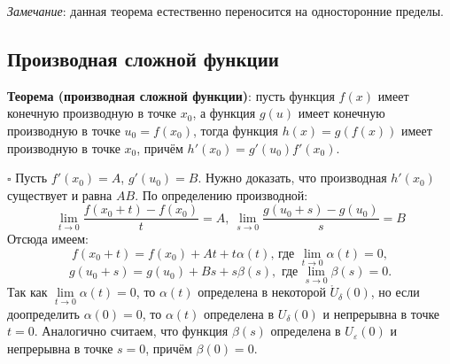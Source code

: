 \documentclass[12pt, a4paper, reqno]{article}
\begin{document}
    \textit{Замечание}: данная теорема естественно переносится на односторонние пределы.

\subsection{Производная сложной функции}

    \textbf{Теорема (производная сложной функции)}: пусть функция $f(x)$ имеет конечную производную
    в точке $x_0$, а функция $g(u)$ имеет конечную производную в точке $u_0 = f(x_0)$, тогда функция
    $h(x) = g(f(x))$ имеет производную в точке $x_0$, причём $h'(x_0) = g'(u_0)f'(x_0)$.

    $\square$ Пусть $f'(x_0) = A$, $g'(u_0) = B$. Нужно доказать, что производная $h'(x_0)$
    существует и равна $AB$. По определению производной:
    \begin{equation*}
    \lim\limits_{t\to 0}\dfrac{f(x_0 + t) - f(x_0)}{t} = A,\
    \lim\limits_{s\to 0}\dfrac{g(u_0 + s) - g(u_0)}{s} = B
    \end{equation*}
    Отсюда имеем:
    \begin{equation*}
        f(x_0 + t) = f(x_0) + At + t\alpha(t)\text{, где }\lim\limits_{t\to 0}\alpha(t) = 0,
    \end{equation*}
    \begin{equation}\label{e}
        g(u_0 + s) = g(u_0) + Bs + s\beta(s),\text{ где }\lim\limits_{s\to 0}\beta(s) = 0.
    \end{equation}
    Так как $\lim\limits_{t\to 0}\alpha(t) = 0$, то $\alpha(t)$ определена в некоторой $\mathring
    U_{\delta}(0)$, но если доопределить $\alpha(0) = 0$, то $\alpha(t)$ определена в
    $U_{\delta}(0)$ и непрерывна в точке $t = 0$. Аналогично считаем, что функция $\beta(s)$
    определена в $U_{\varepsilon}(0)$ и непрерывна в точке $s = 0$, причём $\beta(0) = 0$.
\end{document}

